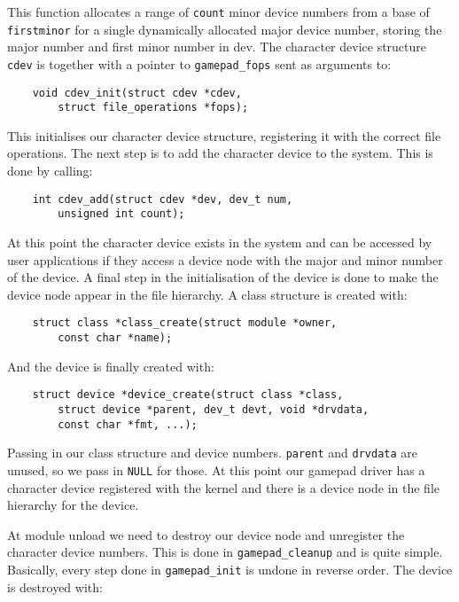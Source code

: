 This function allocates a range of \texttt{count} minor device numbers from a
base of \texttt{firstminor} for a single dynamically allocated major device
number, storing the major number and first minor number in dev. The character
device structure \texttt{cdev} is together with a pointer to
\texttt{gamepad\_fops} sent as arguments to:

\begin{lstlisting}
	void cdev_init(struct cdev *cdev,
		struct file_operations *fops);
\end{lstlisting}

This initialises our character device structure, registering it with the correct
file operations. The next step is to add the character device to the system.
This is done by calling:

\begin{lstlisting}
	int cdev_add(struct cdev *dev, dev_t num,
		unsigned int count);
\end{lstlisting}

At this point the character device exists in the system and can be accessed by
user applications if they access a device node with the major and minor number
of the device. A final step in the initialisation of the device is done to make
the device node appear in the file hierarchy. A class structure is created with:

\begin{lstlisting}
	struct class *class_create(struct module *owner,
		const char *name);
\end{lstlisting}

And the device is finally created with:

\begin{lstlisting}
	struct device *device_create(struct class *class,
		struct device *parent, dev_t devt, void *drvdata,
		const char *fmt, ...);
\end{lstlisting}

Passing in our class structure and device numbers. \texttt{parent} and
\texttt{drvdata} are unused, so we pass in \texttt{NULL} for those. At this
point our gamepad driver has a character device registered with the kernel and
there is a device node in the file hierarchy for the device.

At module unload we need to destroy our device node and unregister the character
device numbers. This is done in \texttt{gamepad\_cleanup} and is quite simple.
Basically, every step done in \texttt{gamepad\_init} is undone in reverse order.
The device is destroyed with:

